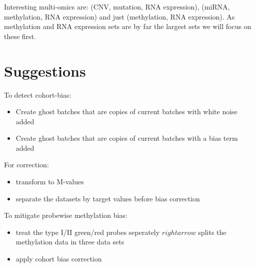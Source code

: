 \documentclass[a4paper,10pt]{article}
\begin{document}
Interesting multi-omics are: (CNV, mutation, RNA expression), (miRNA, methylation, RNA expression) and just (methylation, RNA expression).
As methylation and RNA expression sets are by far the largest sets we will focus on these first. 
%
\section{Suggestions}

To detect cohort-bias:
\begin{itemize}
 \item Create ghost batches that are copies of current batches with white noise added
 \item Create ghost batches that are copies of current batches with a bias term added
\end{itemize}
%
For correction: 
\begin{itemize}
 \item transform to M-values
 \item separate the datasets by target values before bias correction
\end{itemize}
%
To mitigate probewise methylation bias:
\begin{itemize}
 \item treat the type I/II green/red probes seperately $rightarrow$ splits the methylation data in three data sets
 \item apply cohort bias correction
\end{itemize}
%


\end{document}
